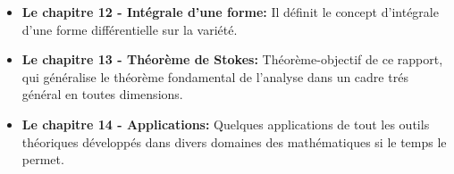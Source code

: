 \begin{itemize}
      \item \textbf{Le chapitre 12 - Intégrale d’une forme:} Il définit le concept d'intégrale d'une forme différentielle sur la variété.
      \item \textbf{Le chapitre 13 - Théorème de Stokes:} Théorème-objectif de ce rapport, qui généralise le théorème fondamental de l'analyse dans un cadre trés général en toutes dimensions.
      \item \textbf{Le chapitre 14 - Applications:} Quelques applications de tout les outils théoriques développés dans divers domaines des mathématiques si le temps le permet.
   \end{itemize}